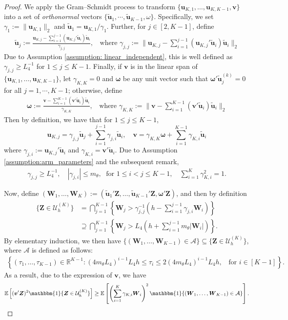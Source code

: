\documentclass[aos,preprint]{imsart}
\theoremstyle{plain}
\theoremstyle{definition}
\newcommand{\bd}[1]{\boldsymbol{#1}}
\newcommand{\idf}{\mathbbm{1}}
\newcommand{\bu}{\boldsymbol{u}}
\newcommand{\bv}{\boldsymbol{v}}
\newcommand{\tbu}{\tilde{\boldsymbol{u}}}
\newcommand{\bZ}{\boldsymbol{Z}}
\newcommand{\bW}{\boldsymbol{W}}
\newcommand{\bR}{\mathbb{R}}
\newcommand{\Exp}{\mathbb{E}}
\begin{document}
\begin{appendix}
\begin{proof}
We apply the  Gram–Schmidt process to transform $\{\bu_{K,1},\ldots,\bu_{K,K-1},\bv\}$ into a set of \textit{orthonormal} vectors $\{\tbu_1 ,\cdots,\tbu_{K-1} , \omega\}$. Specifically, 
we set $\gamma_1 := \|\bu_{K,1}\|_2$ and $\tbu_1  = \bu_{K,1}/\gamma_1$. Further,  for $j \in [2,K-1]$, define
\begin{align*}
   \tbu_j :=   \frac{\bu_{K,j} - \sum_{i=1}^{j-1} (\bu_{K,j}'\tbu_i) \tbu_i}{\gamma_{j,j}}, \;\;\text{ where } \gamma_{j,j}:= \|\bu_{K,j} - \sum_{i=1}^{j-1}(\bu_{K,j}'\tbu_i) \tbu_i\|_2
\end{align*}
Due to Assumption \ref{assumption: linear_independent}, this is well defined as $\gamma_{j,j} \geq L_4^{-1}$ for $1 \leq j \leq K-1$. Finally, if $\bv$ is in the linear span of $\{\bu_{K,1},\ldots,\bu_{K,K-1}\}$, let $\gamma_{K,K} = 0$ and $\bd{\omega}$ be any unit vector such that $\bd{\omega}'\tbu_j^{(k)}=0$ for all $j=1,\cdots,K-1$; otherwise, define
\begin{align*}
    \bd{\omega} := \frac{\bv  - \sum_{i=1}^{K-1} (\bv '\tbu_i) \tbu_i}{\gamma_{K,K}}, \;\;\text{ where } \gamma_{K,K} 
     := \|\bv  - \sum_{i=1}^{K-1}(\bv '\tbu_i) \tbu_i\|_2
\end{align*}
Then by definition, we have that for $1 \leq j \leq K-1$,
$$
\bu_{K,j} = \gamma_{j,j} \tbu_j + \sum_{i=1}^{j-1}  \gamma_{j,i} \tbu_i, \quad 
\bv = \gamma_{K,K} \bd{\omega} + \sum_{i=1}^{K-1}\gamma_{K,i} \tbu_i
$$
where $\gamma_{j,i} := \bu_{K,j}'\tbu_i$ and $\gamma_{K,i} = \bv '\tbu_i$. Due to Assumption \ref{assumption:arm_parameters} and the subsequent remark,  
\begin{align}\label{aux:coeffs}
    \gamma_{j,j} \geq L_4^{-1}, \quad |\gamma_{j,i}| \leq m_{\theta}, \; \text{ for } 1 \leq i < j \leq K-1, \quad \sum_{i=1}^{K} \gamma_{K,i}^2 = 1.
\end{align}

Now, define $(\bW_1,\ldots, \bW_K) := (\tbu_1'\bZ,\ldots,\tbu_{K-1}'\bZ, \bd{\omega}'\bZ)$,  and then by definition
\begin{align*}
 \{\bZ \in \mathcal{U}_h^{(K)}\}& = \bigcap_{j=1}^{K-1} \left\{ \bW_{j} > \gamma_{j,j}^{-1} (h - \sum_{i=1}^{j-1} \gamma_{j,i} \bW_i) \right\}  \\
 &\supseteq \bigcap_{j=1}^{K-1} \left\{ \bW_{j} > L_4 (h + \sum_{i=1}^{j-1} m_{\theta} |\bW_i|)\right\}.
\end{align*}
By elementary induction, we then have $\{(\bW_1,\ldots,\bW_{K-1}) \in \mathcal{A}\} \subseteq \{\bZ \in \mathcal{U}_h^{(K)}\} $, where $\mathcal{A}$ is defined as follows:
\begin{align*}
    \left\{(\tau_1,\ldots,\tau_{K-1})\in \bR^{K-1}:  (4m_{\theta}L_4)^{i-1}L_4 h \le \tau_i \le 2(4m_{\theta}L_4)^{i-1}L_4 h, \;\;\text{ for }  i \in [K-1]\right\}.
\end{align*}
As a result, due to the expression of $\bv$, we have 
\begin{align*}
    \Exp\left[(\bv'\bZ)^2\idf\{\bZ\in \mathcal{U}_h^{(K)}\}\right]  
    \geq \Exp\left[\left( \sum_{i=1}^{K} \gamma_{K,i} \bW_i\right)^2\idf\{(\bW_1,\ldots,\bW_{K-1}) \in \mathcal{A}\}\right].
\end{align*}


\end{proof}
\end{appendix}
\end{document}
